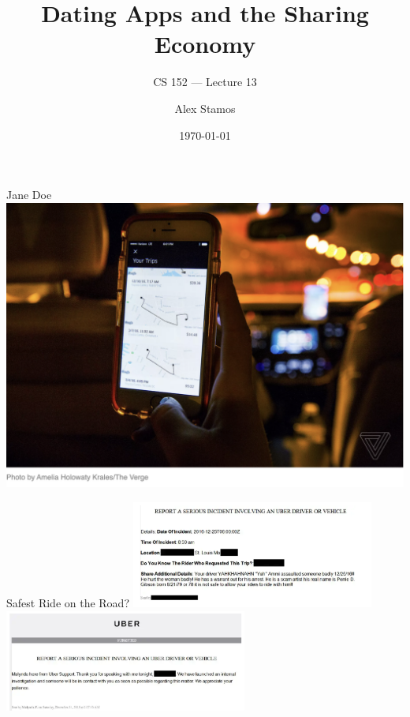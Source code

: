 \documentclass[nobackground,dvipsnames,table,aspectratio=169]{beamer}
\title{Dating Apps and the Sharing Economy}
\subtitle{CS 152 --- Lecture 13}
\author[A. Stamos]{Alex Stamos}
\institute[Stanford University]{Stanford Cyber Policy Center}
\date[2022]{\today}
\begin{document}
\begin{frame}
    \titlepage
\end{frame}

\begin{frame}{}
    \thispagestyle{empty}
\end{frame}

\begin{frame}{Jane Doe}
    \centering
    \includegraphics[height=0.85\textheight]{jane-doe}
\end{frame}

\begin{frame}{Safest Ride on the Road?}
    \centering
    \includegraphics[width=0.6\textwidth]{uber-report-driver-1}
    \includegraphics[width=0.6\textwidth]{uber-report-driver-2}
\end{frame}
\end{document}
